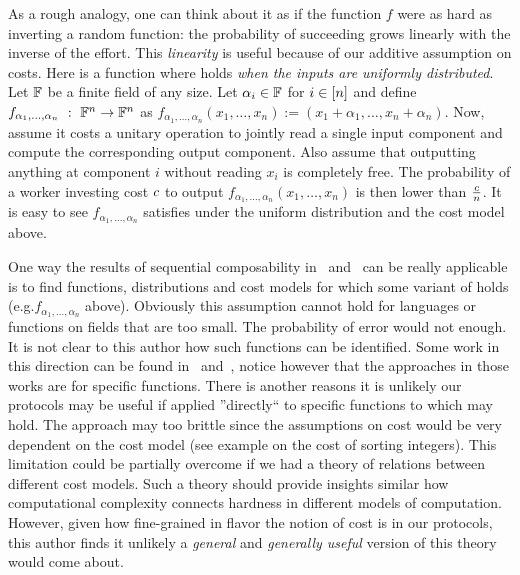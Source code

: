 As a rough analogy, one can think about it as if the function $f$ were as hard as inverting a random function: the probability of succeeding grows linearly with the inverse of the effort.
This \emph{linearity} is useful because of our additive assumption on costs.
Here is a function where \NoFLAVA holds \textit{when the inputs are uniformly distributed}.
Let $\mathbb{F}$ be a finite field of any size. Let $\alpha_i \in \mathbb{F}$ for $i \in [n]$ and define $f_{\alpha_1,\dots,\alpha_n}~:~\mathbb{F}^n \to \mathbb{F}^n$ as
$f_{\alpha_1,\dots,\alpha_n}(x_1,\dots,x_n) := (x_1+\alpha_1,\dots,x_n+\alpha_n)$.
Now, assume it costs a unitary operation to jointly read a single input component and compute the corresponding output component. Also assume that outputting anything at component $i$ without reading $x_i$ is completely free. The probability of a worker investing cost $c$ to output $f_{\alpha_1,\dots,\alpha_n}(x_1,\dots,x_n)$ is then lower than $\frac{c}{n}$. It is easy to see $f_{\alpha_1,\dots,\alpha_n}$ satisfies \NoFLAVA under the uniform distribution and the cost model above.

One way the results of sequential composability in~\cite{cg15} and~\cite{cg17} can be really applicable is to find functions, distributions and cost models for which some variant of \NoFLAVA holds (e.g.$f_{\alpha_1,\dots,\alpha_n}$ above). 
Obviously this assumption cannot hold for languages or functions on fields that are too small. The probability of error would not enough.
It is not clear to this author how such functions can be identified. Some work in this direction can be found in~\cite{fghardness} 
and~\cite{fggr}, notice however that the approaches in those works are for specific functions.
There is another reasons it is unlikely our protocols may be useful if applied ''directly`` to specific functions to which \NoFLAVA may hold. 
The approach may too brittle since the assumptions on cost would be very dependent on the cost model (see example on the cost of sorting integers). This limitation could be partially overcome if we had a theory of relations between different cost models. Such a theory should  provide insights similar how computational complexity connects hardness in different models of computation. However, given how fine-grained in  flavor the notion of cost is in our protocols, this author finds it unlikely a \textit{general} and \textit{generally useful} version of this theory would come about.

